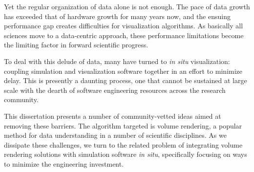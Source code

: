 Yet the regular organization of data alone is not enough.  The pace of
data growth has exceeded that of hardware growth for many years now,
and the ensuing performance gap creates difficulties for visualization
algorithms.  As basically all sciences move to a data-centric approach,
these performance limitations become the limiting factor in forward
scientific progress.

To deal with this delude of data, many have turned to \textit{in situ}
visualization: coupling simulation and visualization software together
in an effort to minimize delay.  This is presently a daunting process,
one that cannot be sustained at large scale with the dearth of software
engineering resources across the research community.

This dissertation presents a number of community-vetted ideas aimed at
removing these barriers.  The algorithm targeted is volume rendering,
a popular method for data understanding in a number of scientific
disciplines.  As we dissipate these challenges, we turn to the related
problem of integrating volume rendering solutions with
simulation software \textit{in situ}, specifically focusing on ways to
minimize the engineering investment.
